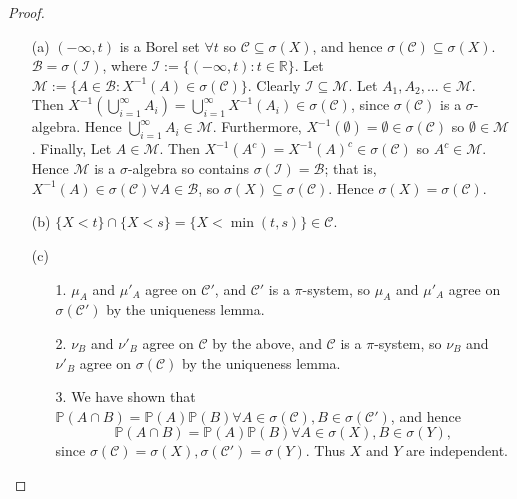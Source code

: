 \documentclass{article}
\begin{document}
\begin{proof}
\begin{enumerate}
    \item[(a)] $(-\infty,t)$ is a Borel set $\forall t$ so $\mathcal{C}\subseteq\sigma(X)$, and hence $\sigma(\mathcal{C})\subseteq\sigma(X)$. $\mathcal{B}=\sigma(\mathcal{I})$, where $\mathcal{I}:=\{(-\infty,t):t\in\mathbb{R}\}$. Let $\mathcal{M}:=\{A\in\mathcal{B}:X^{-1}(A)\in\sigma(\mathcal{C})\}$. Clearly $\mathcal{I}\subseteq\mathcal{M}$. Let $A_1,A_2,...\in\mathcal{M}$. Then $X^{-1}(\bigcup_{i=1}^\infty A_i)=\bigcup_{i=1}^\infty X^{-1}(A_i)\in\sigma(\mathcal{C})$, since $\sigma(\mathcal{C})$ is a $\sigma$-algebra. Hence $\bigcup_{i=1}^\infty A_i\in\mathcal{M}$. Furthermore, $X^{-1}(\emptyset)=\emptyset\in\sigma(\mathcal{C})$ so $\emptyset\in\mathcal{M}$. Finally, Let $A\in\mathcal{M}$. Then $X^{-1}(A^c)=X^{-1}(A)^c\in\sigma(\mathcal{C})$ so $A^c\in\mathcal{M}$. Hence $\mathcal{M}$ is a $\sigma$-algebra so contains $\sigma(\mathcal{I})=\mathcal{B}$; that is, $X^{-1}(A)\in\sigma(\mathcal{C})\forall A\in\mathcal{B}$, so $\sigma(X)\subseteq\sigma(\mathcal{C})$. Hence $\sigma(X)=\sigma(\mathcal{C})$.
    \item[(b)] $\{X<t\}\cap\{X<s\}=\{X<\min(t,s)\}\in\mathcal{C}$.
    \item[(c)]
    \begin{itemize}
        \item[1.] $\mu_A$ and $\mu'_A$ agree on $\mathcal{C}'$, and $\mathcal{C}'$ is a $\pi$-system, so $\mu_A$ and $\mu'_A$ agree on $\sigma(\mathcal{C}')$ by the uniqueness lemma.
        \item[2.] $\nu_B$ and $\nu'_B$ agree on $\mathcal{C}$ by the above, and $\mathcal{C}$ is a $\pi$-system, so $\nu_B$ and $\nu'_B$ agree on $\sigma(\mathcal{C})$ by the uniqueness lemma.
        \item[3.] We have shown that $\mathbb{P}(A\cap B)=\mathbb{P}(A)\mathbb{P}(B)\forall A\in\sigma(\mathcal{C}),B\in\sigma(\mathcal{C}')$, and hence \[\mathbb{P}(A\cap B)=\mathbb{P}(A)\mathbb{P}(B)\forall A\in\sigma(X),B\in\sigma(Y),\] since $\sigma(\mathcal{C})=\sigma(X),\sigma(\mathcal{C}')=\sigma(Y)$. Thus $X$ and $Y$ are independent.
    \end{itemize}
\end{enumerate}
\end{proof}
\end{document}
